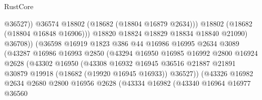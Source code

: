 \begin{lexlean}{RustCore}
\begin{coremodule}
                                            @36527))
                                        @36574
                                        @18802
                                        (@18682 (@18804 @16879 @2634)))
                                      @18802
                                      (@18682 (@18804 @16848 @16906)))
                                    @18820
                                    @18824
                                    @18829
                                    @18834
                                    @18840
                                    @21090)
                                  @36708))
                              (@36598
                                @16919
                                @1823
                                @386
                                @44
                                @16986
                                @16995
                                @2634
                                @3089
                                (@43287
                                  @16986
                                  @16993
                                  @2850
                                  (@43294
                                    @16950
                                    @16985
                                    @16992
                                    @2800
                                    @16924
                                    @2628
                                    (@43302
                                      @16950
                                      (@43308
                                        @16932
                                        @16945
                                        @36516
                                        @21887
                                        @21891
                                        @30879
                                        @19918
                                        (@18682 (@19920 @16945 @16933))
                                        @36527))
                                    (@43326
                                      @16982
                                      @2634
                                      @2680
                                      @2800
                                      @16956
                                      @2628
                                      (@43334
                                        @16982
                                        (@43340
                                          @16964
                                          @16977
                                          @36560

\end{coremodule}
\end{lexlean}
